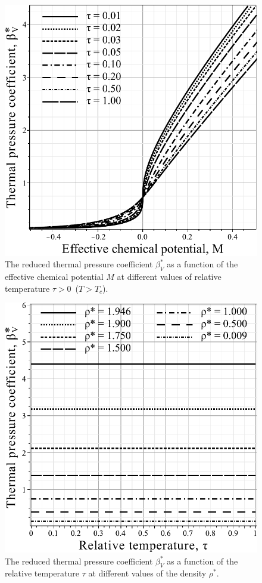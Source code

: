 \documentclass[fleqn,twoside,twocolumn,nofootinbib,showkeys]{revtex4} %
\begin{document}
	\begin{figure}[h!]
		\includegraphics[width=\column]{f3b.pdf}
		\vskip-3mm
		\caption{The reduced thermal pressure coefficient $\beta^*_V$ as a function of the effective chemical potential $M$ at different values of relative temperature $\tau > 0$~($T > T_c$). 
		}
		\label{fig3b}
	\end{figure}
	\begin{figure}[h!]
		\includegraphics[width=\column]{f3c.pdf}
		\vskip-3mm
		\caption{The reduced thermal pressure coefficient $\beta^*_V$ as a function of the relative temperature $\tau$ at different values of the density $\rho^*$. 
		}
		\label{fig3c}
	\end{figure}
	
\end{document}

